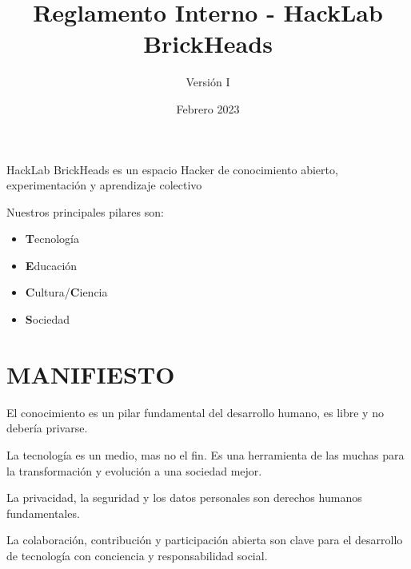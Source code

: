 \documentclass[12pt, letterpaper]{article}
\title{Reglamento Interno - HackLab BrickHeads}
\author{Versión I}
\date{Febrero 2023}
\begin{document}
    \maketitle
    \hspace{1cm}
    \begin{center}
        HackLab BrickHeads es un espacio Hacker de conocimiento abierto, 
        experimentación y aprendizaje colectivo
    \end{center}

    Nuestros principales pilares son:
    \begin{itemize}
        \item \textbf{T}ecnología
        \item \textbf{E}ducación
        \item \textbf{C}ultura/\textbf{C}iencia
        \item \textbf{S}ociedad
    \end{itemize}


\section{MANIFIESTO}
    El conocimiento es un pilar fundamental del desarrollo humano, es libre y no
    debería privarse.
    
    La tecnología es un medio, mas no el fin. Es una herramienta de las muchas 
    para la transformación y evolución a una sociedad mejor.

    La privacidad, la seguridad y los datos personales son derechos humanos
    fundamentales.

    La colaboración, contribución y participación abierta son clave para el
    desarrollo de tecnología con conciencia y responsabilidad social.
\end{document}
